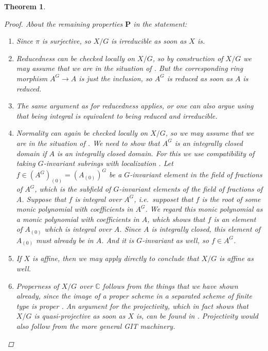 \documentclass[12pt,a4paper]{amsart}
\theoremstyle{plain}
\newtheorem{thm}{Theorem}[section]
\theoremstyle{definition}
\theoremstyle{remark}
\begin{document}
\begin{thm}
\begin{proof}
    About the remaining properties $\mathbf{P}$ in the statement:
    \begin{enumerate}[label=(\alph*)]
      \item Since $\pi$ is surjective, so $X/G$ is irreducible as soon as $X$ is.
      \item Reducedness can be checked locally on $X/G$, so by construction of $X/G$ we may assume that we are in the situation of .
        But the corresponding ring morphism $A^{G} \to A$ is just the inclusion, so $A^{G}$ is reduced as soon as $A$ is reduced.
      \item The same argument as for reducedness applies, or one can also argue using that being integral is equivalent to being reduced and irreducible.
      \item Normality can again be checked locally on $X/G$, so we may assume that we are in the situation of .
        We need to show that $A^{G}$ is an integrally closed domain if $A$ is an integrally closed domain.
        For this we use compatibility of taking $G$-invariant subrings with localization \cite[Exercise 5.12]{am69}.
        Let $f \in (A^{G})_{(0)} = (A_{(0)})^{G}$ be a $G$-invariant element in the field of fractions of $A^{G}$, which is the subfield of $G$-invariant elements of the field of fractions of $A$.
        Suppose that $f$ is integral over $A^{G}$, i.e.~supposet that $f$ is the root of some monic polynomial with coefficients in $A^{G}$.
        We regard this monic polynomial as a monic polynomial with coefficients in $A$, which shows that $f$ is an element of $A_{(0)}$ which is integral over $A$.
        Since $A$ is integrally closed, this element of $A_{(0)}$ must already be in $A$.
        And it is $G$-invariant as well, so $f \in A^{G}$.
      \item If $X$ is affine, then we may apply  directly to conclude that $X/G$ is affine as well.
      \item Properness of $X/G$ over $\mathbb{C}$ follows from the things that we have shown already, since the image of a proper scheme in a separated scheme of finite type is proper \cite[\href{https://stacks.math.columbia.edu/tag/03GN}{Tag 03GN}]{stacks-project}.
        An argument for the projectivity, which in fact shows that $X/G$ is quasi-projective as soon as $X$ is, can be found in \cite[Proposition IV.1.5]{knu71}.
        Projectivity would also follow from the more general GIT machinery.
    \end{enumerate}
  \end{proof}
\end{thm}



\vfill
\end{document}
